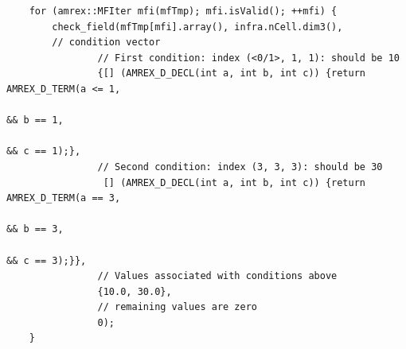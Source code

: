 \documentclass[11pt]{article}
\begin{document}
\begin{lstlisting}
    for (amrex::MFIter mfi(mfTmp); mfi.isValid(); ++mfi) {
        check_field(mfTmp[mfi].array(), infra.nCell.dim3(), 
        // condition vector
                // First condition: index (<0/1>, 1, 1): should be 10
                {[] (AMREX_D_DECL(int a, int b, int c)) {return AMREX_D_TERM(a <= 1,
                                                                          && b == 1,
                                                                          && c == 1);},
                // Second condition: index (3, 3, 3): should be 30
                 [] (AMREX_D_DECL(int a, int b, int c)) {return AMREX_D_TERM(a == 3,
                                                                          && b == 3,
                                                                          && c == 3);}},
                // Values associated with conditions above    
                {10.0, 30.0},
                // remaining values are zero
                0);
    }
\end{lstlisting}
\end{document}
